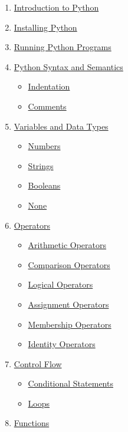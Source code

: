 \documentclass[
  letterpaper,
  DIV=11,
  numbers=noendperiod]{scrreprt}
\providecommand{\tightlist}{%
  \setlength{\itemsep}{0pt}\setlength{\parskip}{0pt}}\usepackage{longtable,booktabs,array}
\begin{document}
\begin{enumerate}
\def\labelenumi{\arabic{enumi}.}
\tightlist
\item
  \hyperref[introduction-to-python]{Introduction to Python}
\item
  \hyperref[installing-python]{Installing Python}
\item
  \hyperref[running-python-programs]{Running Python Programs}
\item
  \hyperref[python-syntax-and-semantics]{Python Syntax and Semantics}

  \begin{itemize}
  \tightlist
  \item
    \hyperref[indentation]{Indentation}
  \item
    \hyperref[comments]{Comments}
  \end{itemize}
\item
  \hyperref[variables-and-data-types]{Variables and Data Types}

  \begin{itemize}
  \tightlist
  \item
    \hyperref[numbers]{Numbers}
  \item
    \hyperref[strings]{Strings}
  \item
    \hyperref[booleans]{Booleans}
  \item
    \hyperref[none]{None}
  \end{itemize}
\item
  \hyperref[operators]{Operators}

  \begin{itemize}
  \tightlist
  \item
    \hyperref[arithmetic-operators]{Arithmetic Operators}
  \item
    \hyperref[comparison-operators]{Comparison Operators}
  \item
    \hyperref[logical-operators]{Logical Operators}
  \item
    \hyperref[assignment-operators]{Assignment Operators}
  \item
    \hyperref[membership-operators]{Membership Operators}
  \item
    \hyperref[identity-operators]{Identity Operators}
  \end{itemize}
\item
  \hyperref[control-flow]{Control Flow}

  \begin{itemize}
  \tightlist
  \item
    \hyperref[conditional-statements]{Conditional Statements}
  \item
    \hyperref[loops]{Loops}
  \end{itemize}
\item
  \hyperref[functions]{Functions}


\end{enumerate}
\end{document}

